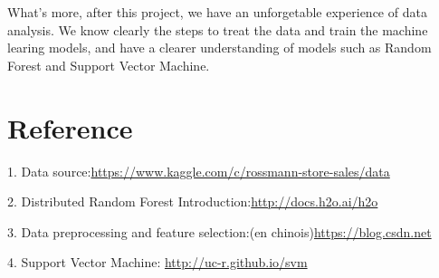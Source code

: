 \documentclass[12pt]{article}
\begin{document}
What's more, after this project, we have an unforgetable experience of data analysis. We know clearly the steps to treat the data and train the machine learing models, and have a clearer understanding of models such as Random Forest and Support Vector Machine.

\section{\textbf{Reference}}

1. Data source:\href{https://www.kaggle.com/c/rossmann-store-sales/data}{https://www.kaggle.com/c/rossmann-store-sales/data}

2. Distributed Random Forest Introduction:\href{http://docs.h2o.ai/h2o/latest-stable/h2o-docs/data-science/drf.html}{http://docs.h2o.ai/h2o}

3. Data preprocessing and feature selection:(en chinois)\href{https://blog.csdn.net/u010089444/article/details/70053104}{https://blog.csdn.net}

4. Support Vector Machine: \href{http://uc-r.github.io/svm}{http://uc-r.github.io/svm}
\end{document}
